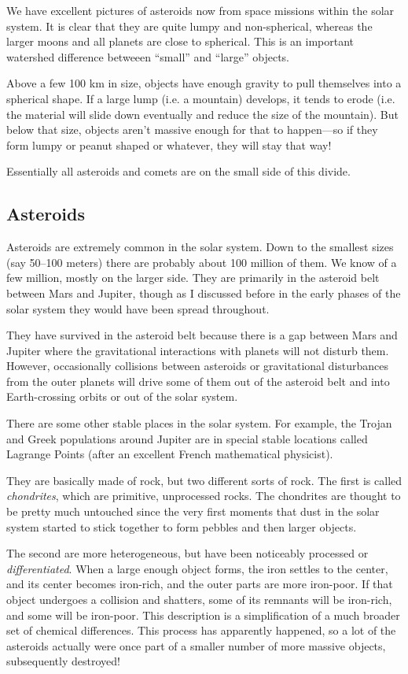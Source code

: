 \documentclass[12pt, preprint]{aastex}
\begin{document}
We have excellent pictures of asteroids now from space missions within
the solar system. It is clear that they are quite lumpy and
non-spherical, whereas the larger moons and all planets are close to
spherical. This is an important watershed difference betweeen
``small'' and ``large'' objects.

Above a few 100 km in size, objects have enough gravity to pull
themselves into a spherical shape. If a large lump (i.e. a mountain)
develops, it tends to erode (i.e. the material will slide down
eventually and reduce the size of the mountain).  But below that size,
objects aren't massive enough for that to happen---so if they form
lumpy or peanut shaped or whatever, they will stay that way!

Essentially all asteroids and comets are on the small side of this
divide. 

\subsection{Asteroids}

Asteroids are extremely common in the solar system. Down to the
smallest sizes (say 50--100 meters) there are probably about 100 million of
them. We know of a few million, mostly on the larger side. They are
primarily in the asteroid belt between Mars and Jupiter, though as I
discussed before in the early phases of the solar system they would
have been spread throughout.

They have survived in the asteroid belt because there is a gap between
Mars and Jupiter where the gravitational interactions with planets
will not disturb them. However, occasionally collisions between
asteroids or gravitational disturbances from the outer planets will
drive some of them out of the asteroid belt and into Earth-crossing
orbits or out of the solar system.

There are some other stable places in the solar system. For example,
the Trojan and Greek populations around Jupiter are in special stable
locations called Lagrange Points (after an excellent French
mathematical physicist).

They are basically made of rock, but two different sorts of rock. The
first is called {\it chondrites}, which are primitive, unprocessed
rocks. The chondrites are thought to be pretty much untouched since
the very first moments that dust in the solar system started to stick
together to form pebbles and then larger objects.

The second are more heterogeneous, but have been noticeably processed
or {\it differentiated}. When a large enough object forms, the iron
settles to the center, and its center becomes iron-rich, and the outer
parts are more iron-poor. If that object undergoes a collision and
shatters, some of its remnants will be iron-rich, and some will be
iron-poor. This description is a simplification of a much broader set
of chemical differences. This process has apparently happened, so a
lot of the asteroids actually were once part of a smaller number of
more massive objects, subsequently destroyed!
\end{document}

